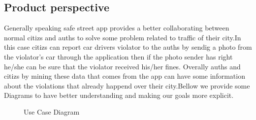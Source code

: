 \documentclass{article}
\begin{document}
	

	\subsection{Product perspective} Generally speaking safe street app provides a better collaborating between normal citizs and auths to solve some problem related to traffic of their city.In this case citizs can report car drivers violator to the auths by sendig a photo from the violator's car through the application then if the photo sender has right he/she can be sure that the violator received his/her fines. Overally auths and citizs by mining these data that comes from the app can have some information about the violations that already happend over their city.Bellow we provide some Diagrams to have better understanding and making our goals more explicit.
	
	\begin{figure}[H]
		\centering
		\def\svgwidth{\columnwidth}
		
		\caption{Use Case Diagram}
	\end{figure}

		
		
\end{document}
